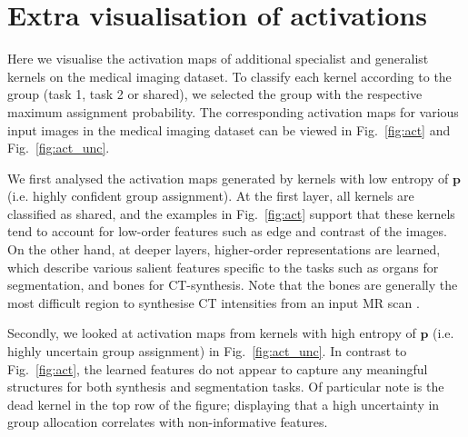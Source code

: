 \section{Extra visualisation of activations}
Here we visualise the activation maps of additional specialist and generalist kernels on the medical imaging dataset. To classify each kernel according to the group (task 1, task 2 or shared), we selected the group with the respective maximum assignment probability. The corresponding activation maps for various input images in the medical imaging dataset can be viewed in Fig.~\ref{fig:act} and Fig.~\ref{fig:act_unc}. 

We first analysed the activation maps generated by kernels with low entropy of $\mathbf{p}$ (i.e. highly confident group assignment). At the first layer, all kernels are classified as shared, and the examples in Fig.~\ref{fig:act} support that these kernels tend to account for low-order features such as edge and contrast of the images. On the other hand, at deeper layers, higher-order representations are learned, which describe various salient features specific to the tasks such as organs for segmentation, and bones for CT-synthesis. Note that the bones are generally the most difficult region to synthesise CT intensities from an input MR scan \cite{bragman2018multi}.

Secondly, we looked at activation maps from kernels with high entropy of $\mathbf{p}$ (i.e. highly uncertain group assignment) in Fig.~\ref{fig:act_unc}. In contrast to Fig.~\ref{fig:act}, the learned features do not appear to capture any meaningful structures for both synthesis and segmentation tasks. Of particular note is the dead kernel in the top row of the figure; displaying that a high uncertainty in group allocation correlates with non-informative features. 

